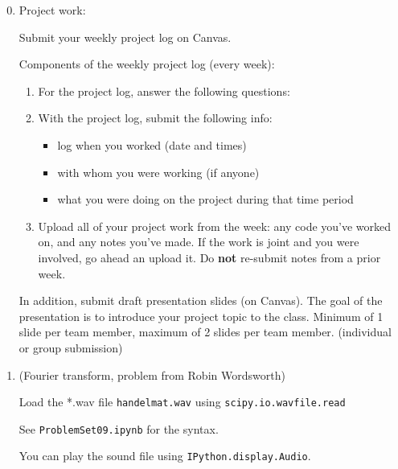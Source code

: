 \documentclass[12pt,letterpaper,noanswers]{exam}
\begin{document}
\begin{enumerate}
\setcounter{enumi}{-1}
    \item Project work:
    
    Submit your weekly project log on Canvas.
    
    Components of the weekly project log (every week):
\begin{enumerate}
\item For the project log, answer the following questions:
\item With the project log, submit the following info:
\begin{itemize}
    \item log when you worked (date and times)
\item with whom you were working (if anyone)
\item what you were doing on the project during that time period
\end{itemize}
\item Upload all of your project work from the week: any code you've worked on, and any notes you've made. If the work is joint and you were involved, go ahead an upload it.  Do \textbf{not} re-submit notes from a prior week.
\end{enumerate}

In addition, submit draft presentation slides (on Canvas).  The goal of the presentation is to introduce your project topic to the class.  Minimum of 1 slide per team member, maximum of 2 slides per team member.  (individual or group submission)

\item (Fourier transform, problem from Robin Wordsworth)

Load the *.wav file \texttt{handelmat.wav} using \texttt{scipy.io.wavfile.read} 

See \texttt{ProblemSet09.ipynb} for the syntax.

You can play the sound file using \texttt{IPython.display.Audio}.
\end{enumerate}
\end{document}
